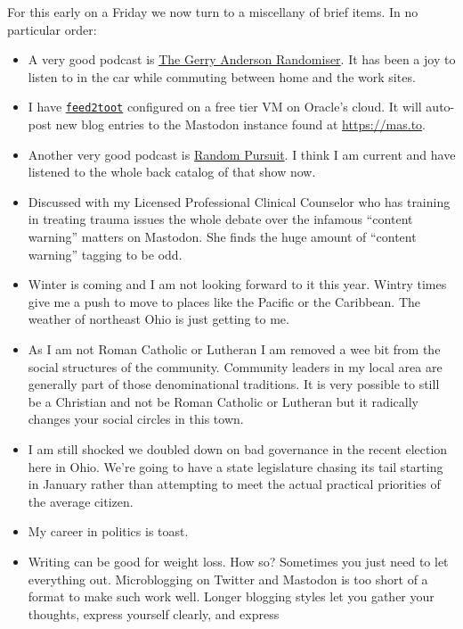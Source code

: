 For this early on a Friday we now turn to a miscellany of brief items.
In no particular order:

\begin{itemize}
\tightlist
\item
  A very good podcast is
  \href{https://gerry-anderson-randomiser.captivate.fm}{The Gerry
  Anderson Randomiser}. It has been a joy to listen to in the car while
  commuting between home and the work sites.
\item
  I have \href{https://pypi.org/project/feed2toot/}{\texttt{feed2toot}}
  configured on a free tier VM on Oracle's cloud. It will auto-post new
  blog entries to the Mastodon instance found at \url{https://mas.to}.
\item
  Another very good podcast is
  \href{https://www.theincomparable.com/gameshow/trivia/}{Random
  Pursuit}. I think I am current and have listened to the whole back
  catalog of that show now.
\item
  Discussed with my Licensed Professional Clinical Counselor who has
  training in treating trauma issues the whole debate over the infamous
  ``content warning'' matters on Mastodon. She finds the huge amount of
  ``content warning'' tagging to be odd.\\
\item
  Winter is coming and I am not looking forward to it this year. Wintry
  times give me a push to move to places like the Pacific or the
  Caribbean. The weather of northeast Ohio is just getting to me.
\item
  As I am not Roman Catholic or Lutheran I am removed a wee bit from the
  social structures of the community. Community leaders in my local area
  are generally part of those denominational traditions. It is very
  possible to still be a Christian and not be Roman Catholic or Lutheran
  but it radically changes your social circles in this town.
\item
  I am still shocked we doubled down on bad governance in the recent
  election here in Ohio. We're going to have a state legislature chasing
  its tail starting in January rather than attempting to meet the actual
  practical priorities of the average citizen.
\item
  My career in politics is toast.
\item
  Writing can be good for weight loss. How so? Sometimes you just need
  to let everything out. Microblogging on Twitter and Mastodon is too
  short of a format to make such work well. Longer blogging styles let
  you gather your thoughts, express yourself clearly, and express

\end{itemize}
